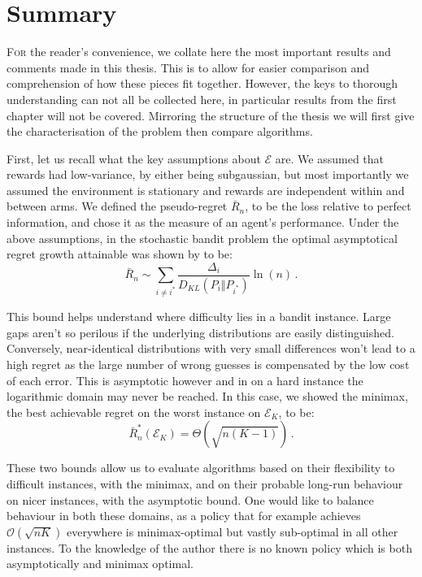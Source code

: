 \chapter*{Summary}

\lettrine[lines=4]{\textcolor{dropcap}{F}}{or} the reader's convenience, we collate here the most important results and comments made in this thesis. This is to allow for easier comparison and comprehension of how these pieces fit together. However, the keys to thorough understanding can not all be collected here, in particular results from the first chapter will not be covered.  Mirroring the structure of the thesis we will first give the characterisation of the problem then compare algorithms. 

\par First, let us recall what the key assumptions about $\mathcal{E}$ are. We assumed that rewards had low-variance, by either being subgaussian, but most importantly we assumed the environment is stationary and rewards are independent within and between arms. We defined the pseudo-regret $\bar{R}_n$, to be the loss relative to perfect information, and chose it as the measure of an agent's performance. 
Under the above assumptions, in the stochastic bandit problem the optimal asymptotical regret growth attainable was shown by \citet{lai-robbins:1985} to be:
\[ \bar{R}_n\sim \sum_{i\neq i^*}\frac{\Delta_i}{D_{KL}(P_i\Vert P_{i^*})}\ln(n)\,.\]

\par This bound helps understand where difficulty lies in a bandit instance. Large gaps aren't so perilous if the underlying distributions are easily distinguished. Conversely, near-identical distributions with very small differences won't lead to a high regret as the large number of wrong guesses is compensated by the low cost of each error. This is asymptotic however and in on a hard instance the logarithmic domain may never be reached. In this case, we showed the minimax, the best achievable regret on the worst instance on $\mathcal{E}_K$, to be: 
\[ \bar{R}_n^*(\mathcal{E}_K)=\Theta\left(\sqrt{n(K-1)}\right)\,.\]

\par These two bounds allow us to evaluate algorithms based on their flexibility to difficult instances, with the minimax, and on their probable long-run behaviour on nicer instances, with the asymptotic bound. One would like to balance behaviour in both these domains, as a policy that for example achieves $\mathcal{O}(\sqrt{nK})$ everywhere is minimax-optimal but vastly sub-optimal in all other instances. To the knowledge of the author there is no known policy which is both asymptotically and minimax optimal. 

